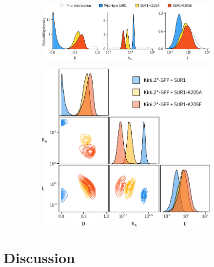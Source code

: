\begin{figure}[h]
\begin{subfigure}[t]{0.45\textwidth}
		\caption{}\label{ch6fig:mwc_k205_3}
		\centering
		\includegraphics[width=\textwidth]{mwc_k205_3.pdf}
	\end{subfigure}
	\hfill
	\begin{subfigure}[t]{0.45\textwidth}
		\caption{}\label{ch6fig:mwc_k205_4}
		\centering
		\includegraphics[width=\textwidth]{mwc_k205_4.pdf}
	\end{subfigure}
	\caption[SUR1 alteers inhibition but not binding]{
	}\label{ch6fig:no_sur}
\end{figure}

\section{Discussion}

